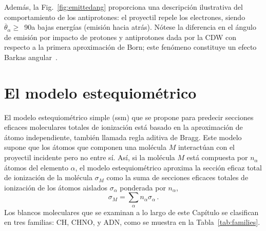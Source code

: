 Además, la Fig.~\ref{fig:emittedang} proporciona una descripción 
ilustrativa del comportamiento de los antiprotones: el proyectil repele 
los electrones, siendo $\overline{\theta}_{\alpha}\ge$~90\textdegree a 
bajas energías (emisión hacia atrás). Nótese la diferencia en el ángulo 
de emisión por impacto de protones y antiprotones dada por la CDW 
con respecto a la primera aproximación de Born; este fenómeno constituye 
un efecto Barkas angular~\cite{Sigmud:03}.

\section{El modelo estequiométrico}
\label{sec:SSM}

El modelo estequiométrico simple (\acs{ssm}) que se propone para 
predecir secciones eficaces moleculares totales de ionización está 
basado en la aproximación de átomo independiente, también llamada regla 
aditiva de Bragg. Este modelo supone que los átomos que componen una 
molécula $M$ interactúan con el proyectil incidente pero no entre sí. 
Así, si la molécula $M$ está compuesta por $n_{\alpha}$ átomos del 
elemento $\alpha$, el modelo estequiométrico aproxima la sección eficaz 
total de ionización de la molécula $\sigma_M$ como la suma de secciones 
eficaces totales de ionización de los átomos aislados 
$\sigma_{\alpha}$ ponderada por $n_{\alpha}$, 
\begin{equation}
\sigma_{M}=\sum\limits_{\alpha}n_{\alpha}\sigma_{\alpha}\,.  
\label{eq:sumion}
\end{equation}
Los blancos moleculares que se examinan a lo largo de este Capítulo se 
clasifican en tres familias: CH, CHNO, y ADN, como se muestra en la 
Tabla~\ref{tab:families}.

